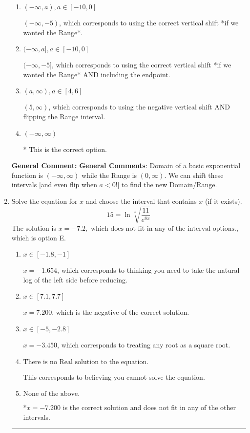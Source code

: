 \documentclass{extbook}[14pt]
\newcommand{\litem}[1]{\item #1

\rule{\textwidth}{0.4pt}}
\begin{document}
\begin{enumerate}
{\begin{enumerate}[label=\Alph*.]
$[5, \infty)$, which corresponds to using the negative vertical shift AND flipping the Range interval AND including the endpoint.
\item \( (-\infty, a), a \in [-10, 0] \)

$(-\infty, -5)$, which corresponds to using the correct vertical shift *if we wanted the Range*.
\item \( (-\infty, a], a \in [-10, 0] \)

$(-\infty, -5]$, which corresponds to using the correct vertical shift *if we wanted the Range* AND including the endpoint.
\item \( (a, \infty), a \in [4, 6] \)

$(5, \infty)$, which corresponds to using the negative vertical shift AND flipping the Range interval.
\item \( (-\infty, \infty) \)

* This is the correct option.
\end{enumerate}

\textbf{General Comment:} \textbf{General Comments}: Domain of a basic exponential function is $(-\infty, \infty)$ while the Range is $(0, \infty)$. We can shift these intervals [and even flip when $a<0$!] to find the new Domain/Range.
}
\litem{
 Solve the equation for $x$ and choose the interval that contains $x$ (if it exists).
\[  15 = \ln{\sqrt[4]{\frac{11}{e^{8x}}}} \]
The solution is \( x = -7.2, \text{ which does not fit in any of the interval options.} \), which is option E.\begin{enumerate}[label=\Alph*.]
\item \( x \in [-1.8, -1] \)

$x = -1.654$, which corresponds to thinking you need to take the natural log of the left side before reducing.
\item \( x \in [7.1, 7.7] \)

$x = 7.200$, which is the negative of the correct solution.
\item \( x \in [-5, -2.8] \)

$x = -3.450$, which corresponds to treating any root as a square root.
\item \( \text{There is no Real solution to the equation.} \)

This corresponds to believing you cannot solve the equation.
\item \( \text{None of the above.} \)

*$x = -7.200$ is the correct solution and does not fit in any of the other intervals.
\end{enumerate}

}
\end{enumerate}
\end{document}
